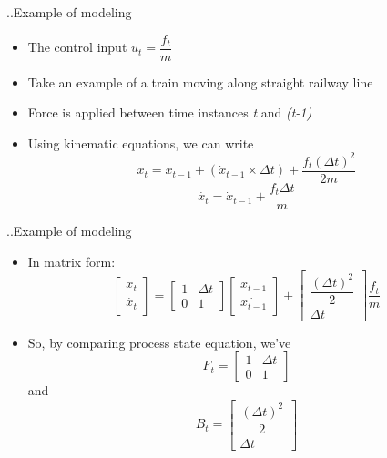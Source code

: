 \documentclass{beamer}
\begin{document}
\begin{frame}{..Example of modeling}
\begin{itemize}
  \item The control input \( u_t = \dfrac{f_t}{m} \)
  \item Take an example of a train moving along straight railway line
  \item Force is applied between time instances \textit{t} and \textit{(t-1)}
  \item Using kinematic equations, we can write
  \[ x_t = x_{t-1} + ( \dot{x}_{t-1} \times \Delta t ) +  \dfrac{f_t(\Delta t)^2}{2m}  \]
  \[ \dot{x_t} = \dot{x}_{t-1} + \dfrac{f_t \Delta t}{m} \]

\end{itemize}
\vskip 1cm
\end{frame}
\begin{frame}{..Example of modeling}
\begin{itemize}
  \item In matrix form:
  \[
    \begin{bmatrix} x_t \\ \dot{x_t} \end{bmatrix} =
    \begin{bmatrix} 1 & \Delta t \\ 0 & 1 \end{bmatrix}
    \begin{bmatrix} x_{t-1} \\ \dot{x_{t-1}} \end{bmatrix} +
    \begin{bmatrix} \dfrac{(\Delta t)^2}{2} \\ \Delta t \end{bmatrix}
    \dfrac{f_t}{m}
  \]
  \item So, by comparing process state equation, we've
  \[ F_t = \begin{bmatrix} 1 & \Delta t \\ 0 & 1 \end{bmatrix} \]
  and
  \[ B_t =  \begin{bmatrix} \dfrac{(\Delta t)^2}{2} \\ \Delta t \end{bmatrix} \]
\end{itemize}
\vskip 1cm
\end{frame}
\end{document}
